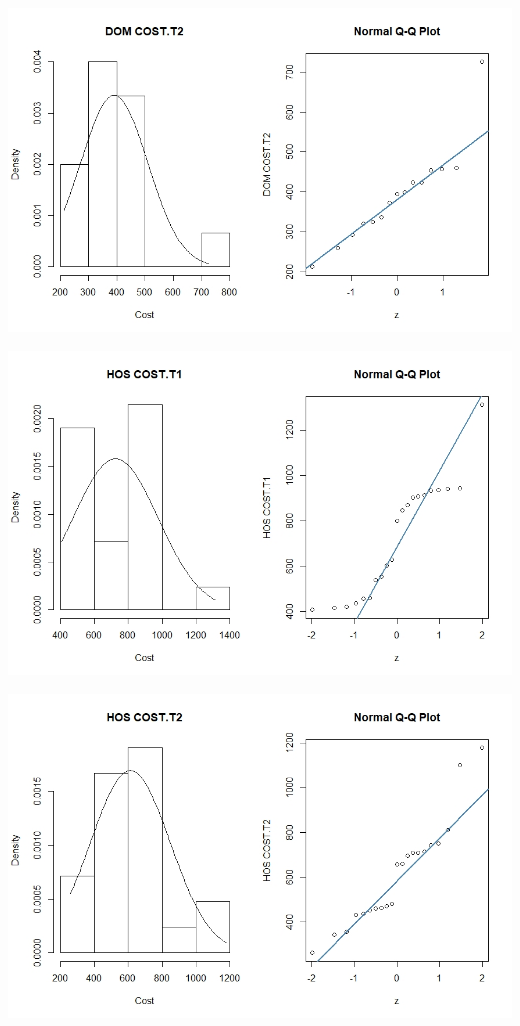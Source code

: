 \documentclass[]{article}
\begin{document}
\centering
\includegraphics[width=\textwidth]{RStudio/jpeg/Norm_DOM_T2.jpeg}
\raggedright


\centering
\includegraphics[width=\textwidth]{RStudio/jpeg/Norm_HOS_T1.jpeg}
\raggedright


\centering
\includegraphics[width=\textwidth]{RStudio/jpeg/Norm_HOS_T2.jpeg}
\raggedright
\end{document}
